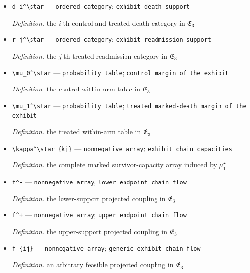 \documentclass{article}
\begin{document}
\begin{itemize}
  \item \texttt{d\_\allowbreak{}i\textasciicircum{}\textbackslash{}\allowbreak{}star} --- \texttt{ordered category}; \texttt{exhibit death support}
  \par\smallskip\noindent\emph{Definition.} the \(i\)-th control and treated death category in \(\mathfrak E_3\)
  \item \texttt{r\_\allowbreak{}j\textasciicircum{}\textbackslash{}\allowbreak{}star} --- \texttt{ordered category}; \texttt{exhibit readmission support}
  \par\smallskip\noindent\emph{Definition.} the \(j\)-th treated readmission category in \(\mathfrak E_3\)
  \item \texttt{\textbackslash{}\allowbreak{}mu\_\allowbreak{}0\textasciicircum{}\textbackslash{}\allowbreak{}star} --- \texttt{probability table}; \texttt{control margin of the exhibit}
  \par\smallskip\noindent\emph{Definition.} the control within-arm table in \(\mathfrak E_3\)
  \item \texttt{\textbackslash{}\allowbreak{}mu\_\allowbreak{}1\textasciicircum{}\textbackslash{}\allowbreak{}star} --- \texttt{probability table}; \texttt{treated marked-\allowbreak{}death margin of the exhibit}
  \par\smallskip\noindent\emph{Definition.} the treated within-arm table in \(\mathfrak E_3\)
  \item \texttt{\textbackslash{}\allowbreak{}kappa\textasciicircum{}\textbackslash{}\allowbreak{}star\_\allowbreak{}\{kj\}\allowbreak{}} --- \texttt{nonnegative array}; \texttt{exhibit chain capacities}
  \par\smallskip\noindent\emph{Definition.} the complete marked survivor-capacity array induced by \(\mu_1^\star\)
  \item \texttt{f\textasciicircum{}-\allowbreak{}} --- \texttt{nonnegative array}; \texttt{lower endpoint chain flow}
  \par\smallskip\noindent\emph{Definition.} the lower-support projected coupling in \(\mathfrak E_3\)
  \item \texttt{f\textasciicircum{}+\allowbreak{}} --- \texttt{nonnegative array}; \texttt{upper endpoint chain flow}
  \par\smallskip\noindent\emph{Definition.} the upper-support projected coupling in \(\mathfrak E_3\)
  \item \texttt{f\_\allowbreak{}\{ij\}\allowbreak{}} --- \texttt{nonnegative array}; \texttt{generic exhibit chain flow}
  \par\smallskip\noindent\emph{Definition.} an arbitrary feasible projected coupling in \(\mathfrak E_3\)

\end{itemize}
\end{document}
